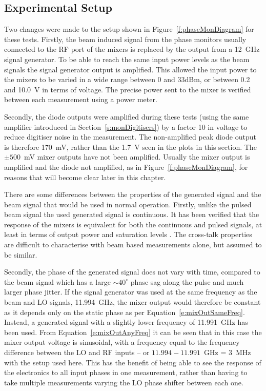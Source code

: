 \subsection{Experimental Setup}
\label{ss:sigGenSetup}

Two changes were made to the setup shown in Figure~\ref{f:phaseMonDiagram} for these tests. Firstly, the beam induced signal from the phase monitors usually connected to the RF port of the mixers is replaced by the output from a 12~GHz signal generator. To be able to reach the same input power levels as the beam signals the signal generator output is amplified. This allowed the input power to the mixers to be varied in a wide range between 0 and 33dBm, or between 0.2 and 10.0~V in terms of voltage. The precise power sent to the mixer is verified between each measurement using a power meter. 

Secondly, the diode outputs were amplified during these tests (using the same amplifier introduced in Section~\ref{s:monDigitisers}) by a factor 10 in voltage to reduce digitiser noise in the measurement. The non-amplified peak diode output is therefore 170~mV, rather than the 1.7~V seen in the plots in this section. The \(\pm500\)~mV mixer outputs have not been amplified. Usually the mixer output is amplified and the diode not amplified, as in Figure~\ref{f:phaseMonDiagram}, for reasons that will become clear later in this chapter.

There are some differences between the properties of the generated signal and the beam signal that would be used in normal operation. Firstly, unlike the pulsed beam signal the used generated signal is continuous. It has been verified that the response of the mixers is equivalent for both the continuous and pulsed signals, at least in terms of output power and saturation levels \cite{jackFONTOct15}. The cross-talk properties are difficult to characterise with beam based measurements alone, but assumed to be similar.

Secondly, the phase of the generated signal does not vary with time, compared to the beam signal which has a large \(\sim40^\circ\) phase sag along the pulse and much larger phase jitter. If the signal generator was used at the same frequency as the beam and LO signals, 11.994~GHz, the mixer output would therefore be constant as it depends only on the static phase as per Equation~\ref{e:mixOutSameFreq}. Instead, a generated signal with a slightly lower frequency of 11.991~GHz has been used. From Equation~\ref{e:mixOutAnyFreq} it can be seen that in this case the mixer output voltage is sinusoidal, with a frequency equal to the frequency difference between the LO and RF inputs -- or \(11.994-11.991\)~GHz = 3~MHz with the setup used here. This has the benefit of being able to see the response of the electronics to all input phases in one measurement, rather than having to take multiple measurements varying the LO phase shifter between each one.

